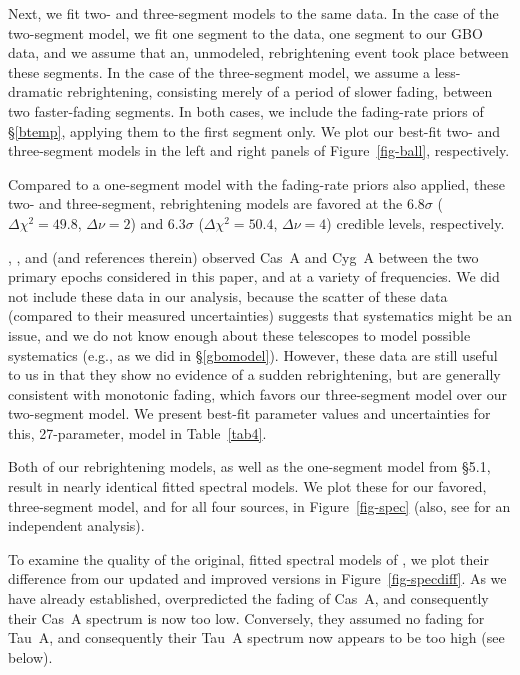 \documentclass[fleqn,usenatbib]{mnras}
\begin{document}
Next, we fit two- and three-segment models to the same data.  In the case of the two-segment model, we fit one segment to the \citet{b77} data, one segment to our GBO data, and we assume that an, unmodeled, rebrightening event took place between these segments.  In the case of the three-segment model, we assume a less-dramatic rebrightening, consisting merely of a period of slower fading, between two faster-fading segments.  In both cases, we include the fading-rate priors of \S\ref{btemp}, applying them to the first segment only.  We plot our best-fit two- and three-segment models in the left and right panels of Figure~\ref{fig-ball}, respectively.  

Compared to a one-segment model with the fading-rate priors also applied, these two- and three-segment, rebrightening models are favored at the 6.8$\sigma$ ($\Delta\chi^2 = 49.8$, $\Delta\nu = 2$) and 6.3$\sigma$ ($\Delta\chi^2 = 50.4$, $\Delta\nu = 4$) credible levels, respectively.  

\citet{v06}, \citet{v07a}, and \citet{v14} (and references therein) observed Cas~A and Cyg~A between the two primary epochs considered in this paper, and at a variety of frequencies.  We did not include these data in our analysis, because the scatter of these data (compared to their measured uncertainties) suggests that systematics might be an issue, and we do not know enough about these telescopes to model possible systematics (e.g., as we did in \S\ref{gbomodel}).  However, these data are still useful to us in that they show no evidence of a sudden rebrightening, but are generally consistent with monotonic fading, which favors our three-segment model over our two-segment model.  We present best-fit parameter values and uncertainties for this, 27-parameter, model in Table~\ref{tab4}.  

Both of our rebrightening models, as well as the one-segment model from \S5.1, result in nearly identical fitted spectral models.  We plot these for our favored, three-segment model, and for all four sources, in Figure~\ref{fig-spec} (also, see \citealt{pb16} for an independent analysis).  

To examine the quality of the original, fitted spectral models of \citet{b77}, we plot their difference from our updated and improved versions in Figure~\ref{fig-specdiff}.  As we have already established, \citet{b77} overpredicted the fading of Cas~A, and consequently their Cas~A spectrum is now too low.  Conversely, they assumed no fading for Tau~A, and consequently their Tau~A spectrum now appears to be too high (see below).
\end{document}
